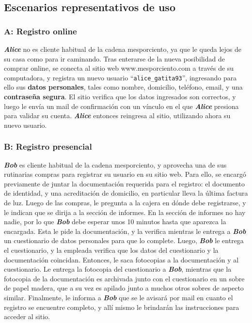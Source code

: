 \newpage
\subsection{Escenarios representativos de uso}

\subsubsection{A: Registro online}

\textbf{\emph{Alice}} no es cliente habitual de la cadena mesporciento, ya que
le queda lejos de su casa como para ir caminando. Tras enterarse de la nueva
posibilidad de comprar online, se conecta al sitio web www.mesporciento.com a
través de su computadora, y registra un nuevo usuario
``\texttt{alice\_gatita93}'', ingresando para ello sus \textbf{datos
personales}, tales como nombre, domicilio, teléfono, email, y una
\textbf{contraseña segura}. El sitio verifica que los datos ingresados son
correctos, y luego le envía un mail de confirmación con un vínculo en el que
\textbf{\emph{Alice}} presiona para validar su cuenta. \textbf{\emph{Alice}}
entonces reingresa al sitio, utilizando ahora su nuevo usuario.

\subsubsection{B: Registro presencial}

\textbf{\emph{Bob}} es cliente habitual de la cadena mesporciento, y aprovecha
una de sus rutinarias compras para registrar su usuario en su sitio web. Para
ello, se encargó previamente de juntar la documentación requerida para el
registro: el documento de identidad, y una acreditación de domicilio, en
particular lleva la última factura de luz. Luego de las compras, le pregunta a
la cajera en dónde debe registrarse, y le indican que se dirija a la sección
de informes. En la sección de informes no hay nadie, por lo que
\textbf{\emph{Bob}} debe esperar unos 10 minutos hasta que aparezca la
encargada. Esta le pide la documentación, y la verifica mientras le entrega a
\textbf{\emph{Bob}} un cuestionario de datos personales para que lo complete.
Luego, \textbf{\emph{Bob}} le entrega el cuestionario, y la empleada verifica
que los datos del cuestionario y la documentación coincidan. Entonces, le saca
fotocopias a la documentación y al cuestionario. Le entrega la fotocopia del
cuestionario a \textbf{\emph{Bob}}, mientras que la fotocopia de la
documentación es archivada junto con el cuestionario en un sobre de papel
madera, que a su vez es apilado junto a muchos otros sobres de aspecto
similar. Finalmente, le informa a \textbf{\emph{Bob}} que se le avisará por
mail en cuanto el registro se encuentre completo, y allí mismo le brindarán
las instrucciones para acceder al sitio.


